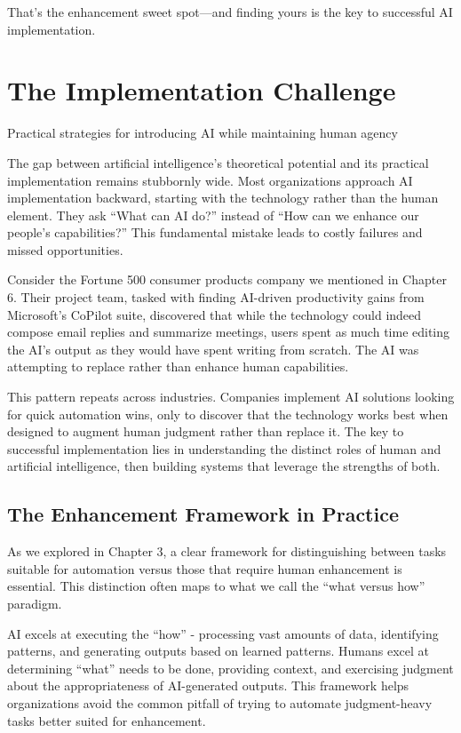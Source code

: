 \documentclass[
  Letterpaper,
]{scrbook}
\begin{document}
That's the enhancement sweet spot---and finding yours is the key to
successful AI implementation.


\chapter{The Implementation
Challenge}\label{the-implementation-challenge}

Practical strategies for introducing AI while maintaining human agency

\hfill\break

The gap between artificial intelligence's theoretical potential and its
practical implementation remains stubbornly wide. Most organizations
approach AI implementation backward, starting with the technology rather
than the human element. They ask ``What can AI do?'' instead of ``How
can we enhance our people's capabilities?'' This fundamental mistake
leads to costly failures and missed opportunities.

Consider the Fortune 500 consumer products company we mentioned in
Chapter 6. Their project team, tasked with finding AI-driven
productivity gains from Microsoft's CoPilot suite, discovered that while
the technology could indeed compose email replies and summarize
meetings, users spent as much time editing the AI's output as they would
have spent writing from scratch. The AI was attempting to replace rather
than enhance human capabilities.

This pattern repeats across industries. Companies implement AI solutions
looking for quick automation wins, only to discover that the technology
works best when designed to augment human judgment rather than replace
it. The key to successful implementation lies in understanding the
distinct roles of human and artificial intelligence, then building
systems that leverage the strengths of both.

\section{The Enhancement Framework in
Practice}\label{the-enhancement-framework-in-practice}

As we explored in Chapter 3, a clear framework for distinguishing
between tasks suitable for automation versus those that require human
enhancement is essential. This distinction often maps to what we call
the ``what versus how'' paradigm.

AI excels at executing the ``how'' - processing vast amounts of data,
identifying patterns, and generating outputs based on learned patterns.
Humans excel at determining ``what'' needs to be done, providing
context, and exercising judgment about the appropriateness of
AI-generated outputs. This framework helps organizations avoid the
common pitfall of trying to automate judgment-heavy tasks better suited
for enhancement.
\end{document}
